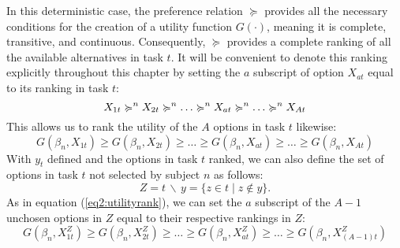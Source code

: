 \documentclass[../main.tex]{subfiles}
\begin{document}
In this deterministic case, the preference relation $\succcurlyeq$ provides all the necessary conditions for the creation of a utility function $G(\cdot)$, meaning it is complete, transitive, and continuous.
Consequently, $\succcurlyeq$ provides a complete ranking of all the available alternatives in task $t$.
It will be convenient to denote this ranking explicitly throughout this chapter by setting the $a$ subscript of option $X_{at}$ equal to its ranking in task $t$:
\begin{equation}
	\label{eq2:outcomerank}
	X_{1t} \succcurlyeq^n X_{2t} \succcurlyeq^n \ldots \succcurlyeq^n X_{at} \succcurlyeq^n \ldots \succcurlyeq^n X_{At}\\
\end{equation}
\noindent This allows us to rank the utility of the $A$ options in task $t$ likewise:
\begin{equation}
	\label{eq2:utilityrank}
	G(\beta_n,X_{1t}) \geq G(\beta_n,X_{2t}) \geq \ldots \geq G(\beta_n,X_{at}) \geq \ldots \geq G(\beta_n,X_{At})
\end{equation}
\noindent With $y_t$ defined and the options in task $t$ ranked, we can also define the set of options in task $t$ not selected by subject $n$ as follows:
\begin{equation}
	\label{eq2:emptyset}
	Z = t \,\backslash\, y = \{z \in t \;|\; z \notin y \}.
\end{equation}
\noindent As in equation (\ref{eq2:utilityrank}), we can set the $a$ subscript of the $A-1$ unchosen options in $Z$ equal to their respective rankings in $Z$:
\begin{equation}
	\label{eq2:Zutilityrank}
	G(\beta_n,X_{1t}^Z) \geq G(\beta_n,X_{2t}^Z) \geq \ldots \geq G(\beta_n,X_{at}^Z) \geq \ldots \geq G(\beta_n,X_{(A-1)t}^Z)
\end{equation}
\end{document}
